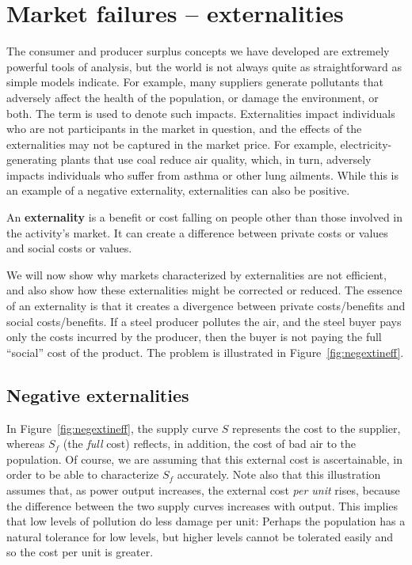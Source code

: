 \section{Market failures -- externalities}\label{sec:ch5sec5}

The consumer and producer surplus concepts we have developed are extremely
powerful tools of analysis, but the world is not always quite as
straightforward as simple models indicate. For example, many suppliers
generate pollutants that adversely affect the health of the population, or
damage the environment, or both. The term  is used
to denote such impacts. Externalities impact individuals who are not
participants in the market in question, and the effects of the externalities
may not be captured in the market price. For example, electricity-generating
plants that use coal reduce air quality, which, in turn, adversely impacts
individuals who suffer from asthma or other lung ailments. While this is an
example of a negative externality, externalities can also be positive.

\begin{DefBox}
An \textbf{externality} is a benefit or cost falling on people other than those involved in the activity's market. It can create a difference between private costs or values and social costs or values.
\end{DefBox}

\newhtmlpage

We will now show why markets characterized by externalities are not
efficient, and also show how these externalities might be corrected or
reduced. The essence of an externality is that it creates a divergence
between private costs/benefits and social costs/benefits. If a steel
producer pollutes the air, and the steel buyer pays only the costs incurred
by the producer, then the buyer is not paying the full ``social'' cost of
the product. The problem is illustrated in Figure~\ref{fig:negextineff}.



\newhtmlpage

\subsection*{Negative externalities}

In Figure~\ref{fig:negextineff}, the supply curve $S$ represents the cost to
the supplier, whereas $S_f$ (the \textit{full} cost) reflects, in
addition, the cost of bad air to the population. Of course, we are assuming
that this external cost is ascertainable, in order to be able to
characterize $S_f$ accurately. Note also that this illustration assumes
that, as power output increases, the external cost \textit{per unit} rises,
because the difference between the two supply curves increases with output.
This implies that low levels of pollution do less damage per unit: Perhaps
the population has a natural tolerance for low levels, but higher levels
cannot be tolerated easily and so the cost per unit is greater.

